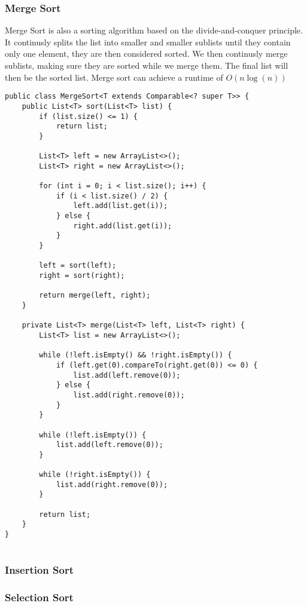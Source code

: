 \documentclass{article}
\begin{document}
    \subsubsection{Merge Sort}
    Merge Sort is also a sorting algorithm based on the divide-and-conquer principle. It continusly splits the list into smaller and smaller sublists until they contain only one element, they are then considered sorted. We then continusly merge sublists, making sure they are sorted while we merge them. The final list will then be the sorted list. Merge sort can achieve a runtime of \( O\left( n \log \left(  n \right) \right) \)
    \begin{lstlisting}
public class MergeSort<T extends Comparable<? super T>> {
    public List<T> sort(List<T> list) {
        if (list.size() <= 1) {
            return list;
        }

        List<T> left = new ArrayList<>();
        List<T> right = new ArrayList<>();

        for (int i = 0; i < list.size(); i++) {
            if (i < list.size() / 2) {
                left.add(list.get(i));
            } else {
                right.add(list.get(i));
            }
        }

        left = sort(left);
        right = sort(right);

        return merge(left, right);
    }

    private List<T> merge(List<T> left, List<T> right) {
        List<T> list = new ArrayList<>();

        while (!left.isEmpty() && !right.isEmpty()) {
            if (left.get(0).compareTo(right.get(0)) <= 0) {
                list.add(left.remove(0));
            } else {
                list.add(right.remove(0));
            }
        }

        while (!left.isEmpty()) {
            list.add(left.remove(0));
        }
        
        while (!right.isEmpty()) {
            list.add(right.remove(0));
        }

        return list;
    }
}
        
    \end{lstlisting}
    \subsubsection{Insertion Sort}
    \subsubsection{Selection Sort}
\end{document}
